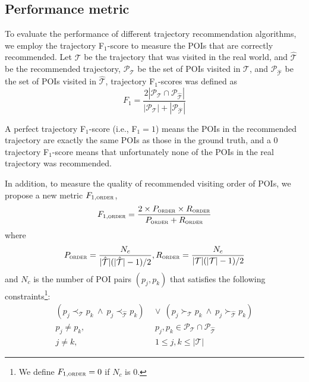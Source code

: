 \subsection{Performance metric}
\label{metric}
%
To evaluate the performance of different trajectory recommendation algorithms,
we employ the trajectory F$_1$-score\cite{ijcai15} to measure the POIs that are
correctly recommended. Let $\mathcal{T}$ be the trajectory that was visited in the real world,
and $\hat{\mathcal{T}}$ be the recommended trajectory,
$\mathcal{P}_{\mathcal{T}}$ be the set of POIs visited in $\mathcal{T}$,
and $\mathcal{P}_{\hat{\mathcal{T}}}$ be the set of POIs visited in $\hat{\mathcal{T}}$,
trajectory F$_1$-scores was defined as
\begin{displaymath}
    F_1 = \frac{2 |\mathcal{P}_{\mathcal{T}} \cap \mathcal{P}_{\hat{\mathcal{T}}}|}
               {|\mathcal{P}_{\mathcal{T}}| + |\mathcal{P}_{\hat{\mathcal{T}}}|}
\end{displaymath}

A perfect trajectory F$_1$-score (i.e., F$_1 = 1$) means the POIs in the recommended trajectory are exactly
the same POIs as those in the ground truth, and a $0$ trajectory F$_1$-score means that unfortunately none of
the POIs in the real trajectory was recommended.

In addition, to measure the quality of recommended visiting order of POIs, 
we propose a new metric $F_{1,\textsc{order}}$,
\begin{displaymath}
F_{1,\textsc{order}} = \frac{2 \times P_{\textsc{order}} \times R_{\textsc{order}}} 
                           {P_{\textsc{order}} + R_{\textsc{order}}}
\end{displaymath}
where 
\begin{displaymath}
P_{\textsc{order}} = \frac{N_c} {|\hat{\mathcal{T}}|(|\hat{\mathcal{T}}|-1) / 2}, 
R_{\textsc{order}} = \frac{N_c} {|\mathcal{T}|(|\mathcal{T}|-1) / 2}
\end{displaymath}
and $N_c$ is the number of POI pairs $(p_j, p_k)$ that satisfies the following 
constraints\footnote{We define $F_{1,\textsc{order}}=0$ if $N_c$ is $0$.}:
\begin{align*}
    (p_j \prec_{\mathcal{T}} p_k ~\land~ p_j \prec_{\hat{\mathcal{T}}} p_k) & ~\lor~
    (p_j \succ_{\mathcal{T}} p_k ~\land~ p_j \succ_{\hat{\mathcal{T}}} p_k) \\
    p_j \ne p_k, &~~ p_j, p_k \in \mathcal{P}_{\mathcal{T}} \cap \mathcal{P}_{\hat{\mathcal{T}}} \\
    j \ne k, &~~ 1 \le j, k \le |\mathcal{T}|
\end{align*}


